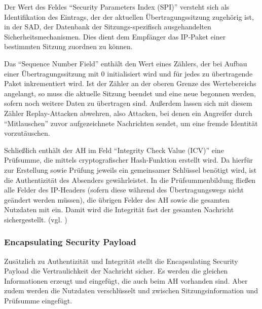 Der Wert des Feldes “Security Parameters Index (SPI)” versteht sich als Identifikation des Eintrags, der der aktuellen Übertragungssitzung zugehörig ist, in der SAD, der Datenbank der Sitzungs-spezifisch ausgehandelten Sicherheitsmechanismen. Dies dient dem Empfänger das IP-Paket einer bestimmten Sitzung zuordnen zu können.

Das “Sequence Number Field” enthält den Wert eines Zählers, der bei Aufbau einer Übertragungssitzung mit 0 initialisiert wird und für jedes zu übertragende Paket inkrementiert wird. Ist der Zähler an der oberen Grenze des Wertebereichs angelangt, so muss die aktuelle Sitzung beendet und eine neue begonnen werden, sofern noch weitere Daten zu übertragen sind. Außerdem lassen sich mit diesem Zähler Replay-Attacken abwehren, also Attacken, bei denen ein Angreifer durch “Mitlauschen” zuvor aufgezeichnete Nachrichten sendet, um eine fremde Identität vorzutäuschen.

Schließlich enthält der AH im Feld “Integrity Check Value (ICV)” eine Prüfsumme, die mittels cryptografischer Hash-Funktion erstellt wird. Da hierfür zur Erstellung sowie Prüfung jeweils ein gemeinsamer Schlüssel benötigt wird, ist die Authentizität des Absenders gewährleistet. In die Prüfsummenbildung fließen alle Felder des IP-Headers (sofern diese während des Übertragungswegs nicht geändert werden müssen), die übrigen Felder des AH sowie die gesamten Nutzdaten mit ein. Damit wird die Integrität fast der gesamten Nachricht sichergestellt.
(vgl. \cite{RFC4302})

\subsubsection{Encapsulating Security Payload}
Zusätzlich zu Authentizität und Integrität stellt die Encapsulating Security Payload die Vertraulichkeit der Nachricht sicher. Es werden die gleichen Informationen erzeugt und eingefügt, die auch beim AH vorhanden sind. Aber zudem werden die Nutzdaten verschlüsselt und zwischen Sitzungsinformation und Prüfsumme eingefügt.

